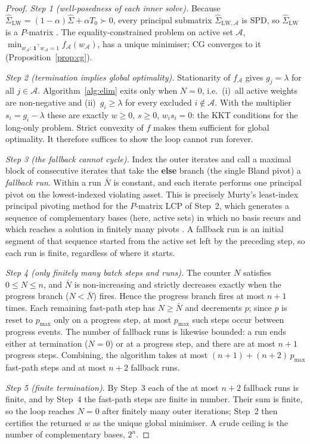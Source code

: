 \begin{proof}
\emph{Step 1 (well-posedness of each inner solve).}
Because $\hat\Sigma_{\mathrm{LW}} = (1-\alpha)\hat\Sigma + \alpha T_0 \succ 0$,
every principal submatrix $\hat\Sigma_{\mathrm{LW},\mathcal{A}}$ is SPD, so
$\hat\Sigma_{\mathrm{LW}}$ is a $P$-matrix \cite{murty1988}.
The equality-constrained problem on active set $\mathcal{A}$,
$\min_{w_\mathcal{A}:\,\mathbf{1}^\top w_\mathcal{A}=1} f_\mathcal{A}(w_\mathcal{A})$,
has a unique minimiser; CG converges to it (Proposition~\ref{prop:cg}).

\emph{Step 2 (termination implies global optimality).}
Stationarity of $f_\mathcal{A}$ gives $g_j = \lambda$ for all $j\in\mathcal{A}$.
Algorithm~\ref{alg:elim} exits only when $N = 0$, i.e.\ (i)~all active weights are
non-negative and (ii)~$g_i \geq \lambda$ for every excluded $i \notin \mathcal{A}$.
With the multiplier $s_i = g_i - \lambda$ these are exactly $w \geq 0$, $s \geq 0$,
$w_i s_i = 0$: the KKT conditions for the long-only problem. Strict convexity of $f$
makes them sufficient for global optimality. It therefore suffices to show the loop
cannot run forever.

\emph{Step 3 (the fallback cannot cycle).}
Index the outer iterates and call a maximal block of consecutive iterates that take
the \textbf{else} branch (the single Bland pivot) a \emph{fallback run}. Within a run
$\bar N$ is constant, and each iterate performs one principal pivot on the
lowest-indexed violating asset. This is precisely Murty's least-index principal
pivoting method for the $P$-matrix LCP of Step~2, which generates a sequence of
complementary bases (here, active sets) in which no basis recurs and which reaches a
solution in finitely many pivots \cite{murty1988}. A fallback run is an initial
segment of that sequence started from the active set left by the preceding step, so
each run is finite, regardless of where it starts.

\emph{Step 4 (only finitely many batch steps and runs).}
The counter $N$ satisfies $0 \le N \le n$, and $\bar N$ is non-increasing and
strictly decreases exactly when the progress branch ($N < \bar N$) fires. Hence the
progress branch fires at most $n+1$ times. Each remaining fast-path step has
$N \ge \bar N$ and decrements $p$; since $p$ is reset to $p_{\max}$ only on a progress
step, at most $p_{\max}$ such steps occur between progress events. The number of
fallback runs is likewise bounded: a run ends either at termination ($N=0$) or at a
progress step, and there are at most $n+1$ progress steps. Combining, the algorithm
takes at most $(n+1) + (n+2)\,p_{\max}$ fast-path steps and at most $n+2$ fallback
runs.

\emph{Step 5 (finite termination).}
By Step~3 each of the at most $n+2$ fallback runs is finite, and by Step~4 the
fast-path steps are finite in number. Their sum is finite, so the loop reaches $N=0$
after finitely many outer iterations; Step~2 then certifies the returned $w$ as the
unique global minimiser. A crude ceiling is the number of complementary bases,
$2^n$.
\end{proof}

